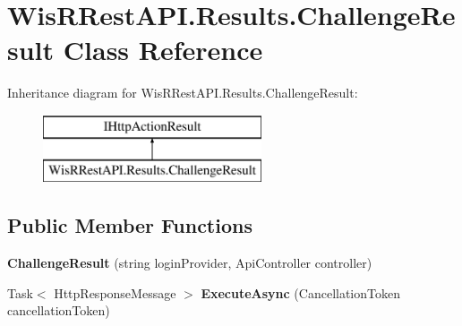 \hypertarget{class_wis_r_rest_a_p_i_1_1_results_1_1_challenge_result}{}\section{Wis\+R\+Rest\+A\+P\+I.\+Results.\+Challenge\+Result Class Reference}
\label{class_wis_r_rest_a_p_i_1_1_results_1_1_challenge_result}
Inheritance diagram for Wis\+R\+Rest\+A\+P\+I.\+Results.\+Challenge\+Result\+:\begin{figure}[H]
\begin{center}
\leavevmode
\includegraphics[height=2.000000cm]{class_wis_r_rest_a_p_i_1_1_results_1_1_challenge_result}
\end{center}
\end{figure}
\subsection*{Public Member Functions}
\begin{DoxyCompactItemize}
\item 
\hypertarget{class_wis_r_rest_a_p_i_1_1_results_1_1_challenge_result_a0866b4ef97cc5cc8cec051c2d65ec99d}{}{\bfseries Challenge\+Result} (string login\+Provider, Api\+Controller controller)\label{class_wis_r_rest_a_p_i_1_1_results_1_1_challenge_result_a0866b4ef97cc5cc8cec051c2d65ec99d}

\item 
\hypertarget{class_wis_r_rest_a_p_i_1_1_results_1_1_challenge_result_a33a3af29fef1ce5ac5c95c5175519529}{}Task$<$ Http\+Response\+Message $>$ {\bfseries Execute\+Async} (Cancellation\+Token cancellation\+Token)\label{class_wis_r_rest_a_p_i_1_1_results_1_1_challenge_result_a33a3af29fef1ce5ac5c95c5175519529}

\end{DoxyCompactItemize}
